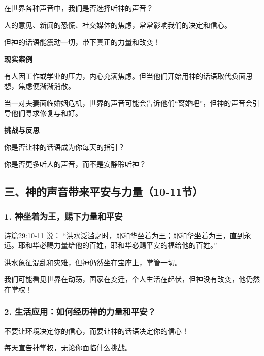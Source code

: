 \documentclass[a4paper, 12pt]{article}
\begin{document}
\hspace{0.6cm}在世界各种声音中，我们是否选择听神的声音？

人的意见、新闻的恐慌、社交媒体的焦虑，常常影响我们的决定和信心。

但神的话语能震动一切，带下真正的力量和改变！

\vspace{0.2cm}

\textbf{现实案例}

\hspace{0.6cm}有人因工作或学业的压力，内心充满焦虑。但当他们开始用神的话语取代负面思想，焦虑便渐渐消散。

\hspace{0.6cm}当一对夫妻面临婚姻危机，世界的声音可能会告诉他们“离婚吧”，但神的声音会引导他们寻求修复与和好。

\vspace{0.2cm}

\textbf{挑战与反思}

\hspace{0.6cm}你是否让神的话语成为你每天的指引？

\hspace{0.6cm}你是否更多听人的声音，而不是安静聆听神？



\subsection*{三、神的声音带来平安与力量（10-11节）}
\subsubsection*{1. 神坐着为王，赐下力量和平安}
\hspace{0.6cm}诗篇29:10-11 说：
“洪水泛滥之时，耶和华坐着为王；耶和华坐着为王，直到永远。耶和华必赐力量给他的百姓，耶和华必赐平安的福给他的百姓。”

洪水象征混乱和灾难，但神仍然坐在宝座上，掌管一切。

我们可能看见世界在动荡，国家在变迁，个人生活在起伏，但神没有改变，他仍然在掌权！
\subsubsection*{2. 生活应用：如何经历神的力量和平安？}

\hspace{0.6cm}不要让环境决定你的信心，而要让神的话语决定你的信心！

每天宣告神掌权，无论你面临什么挑战。
\end{document}
